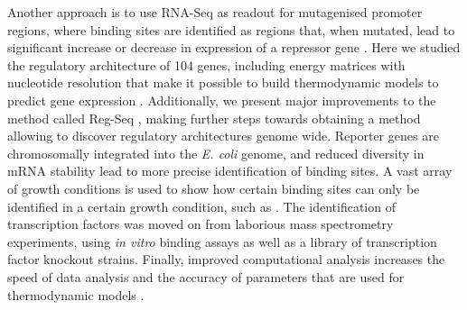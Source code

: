 Another approach is to use RNA-Seq as readout for mutagenised promoter regions, where binding sites are identified as regions that, when mutated, lead to significant increase or decrease in expression of a repressor gene \cite{urtecho2018systematic, urtecho2020genome, ireland2020deciphering}. Here we studied the regulatory architecture of 104 genes, including energy matrices with nucleotide resolution that make it possible to build thermodynamic models to predict gene expression \cite{kinney2010using,belliveau2018systematic,barnes2019mapping,ireland2020deciphering}. Additionally, we present major improvements to the method called Reg-Seq \cite{ireland2020deciphering}, making further steps towards obtaining a method allowing to discover regulatory architectures genome wide. Reporter genes are chromosomally integrated into the \textit{E. coli} genome, and reduced diversity in mRNA stability lead to more precise identification of binding sites. A vast array of growth conditions is used to show how certain binding sites can only be identified in a certain growth condition, such as . The identification of transcription factors was moved on from laborious mass spectrometry experiments, using \textit{in vitro} binding assays as well as a library of transcription factor knockout strains. Finally, improved computational analysis increases the speed of data analysis and the accuracy of parameters that are used for thermodynamic models .



